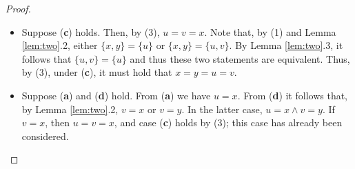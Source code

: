 \begin{proof}
\begin{enumerate}
\begin{itemize}
            (\textbf{d}) can be rewritten to $\{u,v\}=\{x\}$, implying (\textbf{c}) and (\textbf{d}) are equivalent.
            Thus, by (3), under (\textbf{b}), it must hold that $u=v=x=y$.
            \item Suppose (\textbf{c}) holds. Then, by (3), $u=v=x$. Note that, by (1) and Lemma \ref{lem:two}.2, 
            either $\{x,y\}=\{u\}$ or $\{x,y\}=\{u,v\}$.  By Lemma \ref{lem:two}.3, it follows that $\{u,v\}=\{u\}$ and 
            thus these two statements are equivalent. Thus, by (3), under (\textbf{c}), it must hold that $x=y=u=v$.
            \item Suppose (\textbf{a}) and (\textbf{d}) hold. From (\textbf{a}) we have $u=x$. 
            From (\textbf{d}) it follows that, by Lemma \ref{lem:two}.2, $v=x$ or $v=y$. In the latter case, 
            $u=x\land v=y$. If $v=x$, then $u=v=x$, and case (\textbf{c}) holds by (3); this case has already been considered.
        \end{itemize}
    \end{enumerate}
\end{proof}
